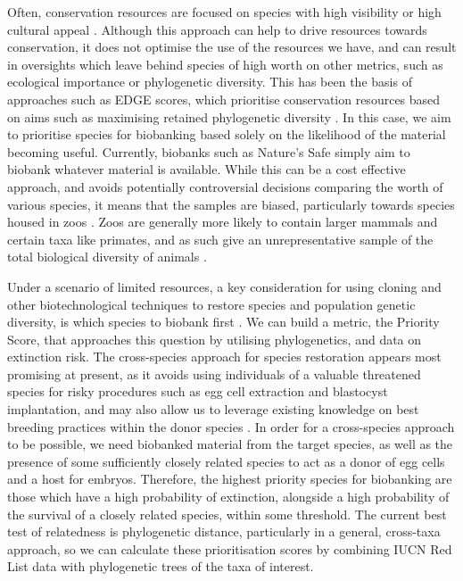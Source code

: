 \documentclass[10pt]{article}
\begin{document}
	Often, conservation resources are focused on species with high visibility or
	high cultural appeal \cite{gunnthorsdottirPhysicalAttractivenessAnimal2001}. Although this approach can help to drive resources
	towards conservation, it does not optimise the use of the resources we have, 
	and can result in oversights which leave behind species of high worth on other
	metrics, such as ecological importance or phylogenetic diversity. This has been
	the basis of approaches such as EDGE scores, which prioritise conservation 
	resources based on aims such as maximising retained phylogenetic diversity \cite{isaacMammalsEDGEConservation2007}. In 
	this case, we aim to prioritise species for biobanking based solely on the 
	likelihood of the material becoming useful. Currently, biobanks such as 
	Nature's Safe simply aim to biobank whatever material is available. While this %
	can be a cost effective approach, and avoids potentially controversial 
	decisions comparing the worth of various species, it means that the samples are
	biased, particularly towards species housed in zoos \cite{mooneyValueExSitu2021}. Zoos are generally more
	likely to contain larger mammals and certain taxa like primates, and as such
	give an unrepresentative sample of the total biological diversity of animals \cite{gunnthorsdottirPhysicalAttractivenessAnimal2001}.
	
	Under a scenario of limited resources, a key consideration for using cloning and other
	biotechnological techniques to restore species and population genetic diversity, is
	which species to biobank first \cite{harwoodDevelopingImplementingPrioritisation}. We can build a metric, the Priority Score, that approaches this 
	question by utilising phylogenetics, and data on extinction risk. The cross-species approach for species restoration appears most promising at present, as it avoids using
	individuals of a valuable threatened species for risky procedures such as egg cell
	extraction and blastocyst implantation, and may also allow us to leverage existing
	knowledge on best breeding practices within the donor species \cite{wiselyRoadMap21st2015}. In order for a
	cross-species approach to be possible, we need biobanked material from the target
	species, as well as the presence of some sufficiently closely related species to act
	as a donor of egg cells and a host for embryos. Therefore, the highest priority species
	for biobanking are those which have a high probability of extinction, alongside a high
	probability of the survival of a closely related species, within some threshold. The current best test of
	relatedness is phylogenetic distance, particularly in a general, cross-taxa approach, so we can calculate these prioritisation
	scores by combining IUCN Red List data with phylogenetic trees of the taxa of 
	interest.
	
\end{document}
